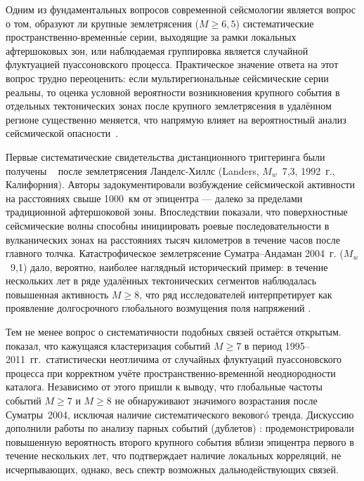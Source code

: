 \documentclass[12pt,a4paper]{article}
\begin{document}
Одним из фундаментальных вопросов современной сейсмологии является вопрос
о том, образуют ли крупные землетрясения ($M\geq6{,}5$) систематические
пространственно-временн\'{ы}е серии, выходящие за рамки локальных афтершоковых
зон, или наблюдаемая группировка является случайной флуктуацией пуассоновского
процесса. Практическое значение ответа на этот вопрос трудно переоценить:
если мультирегиональные сейсмические серии реальны, то оценка условной вероятности
возникновения крупного события в отдельных тектонических зонах после крупного
землетрясения в удалённом регионе существенно меняется, что напрямую влияет
на вероятностный анализ сейсмической опасности~\cite{Cornell1968}.

Первые систематические свидетельства дистанционного триггеринга были получены
\citeauthor{Hill1993}~\cite{Hill1993} после землетрясения Ланделс-Хиллс
(Landers, $M_w$~7,3, 1992~г., Калифорния). Авторы задокументировали возбуждение
сейсмической активности на расстояниях свыше 1000~км от эпицентра --- далеко за
пределами традиционной афтершоковой зоны. Впоследствии \citeauthor{Brodsky2006}
\cite{Brodsky2006} показали, что поверхностные сейсмические волны способны
инициировать роевые последовательности в вулканических зонах на расстояниях
тысяч километров в течение часов после главного толчка. Катастрофическое
землетрясение Суматра--Андаман 2004~г. ($M_w$~9,1) дало, вероятно, наиболее
наглядный исторический пример: в течение нескольких лет в ряде удалённых тектонических
сегментов наблюдалась повышенная активность $M\geq8$, что ряд исследователей
интерпретирует как проявление долгосрочного глобального возмущения поля напряжений
\cite{Freed2001,Pollitz1998}.

Тем не менее вопрос о систематичности подобных связей остаётся открытым.
\citeauthor{Michael2011}~\cite{Michael2011} показал, что кажущаяся кластеризация
событий $M\geq7$ в период 1995--2011~гг.\ статистически неотличима от случайных
флуктуаций пуассоновского процесса при корректном учёте пространственно-временн\'{о}й
неоднородности каталога. Независимо от этого \citeauthor{ShearerStark2012}
\cite{ShearerStark2012} пришли к выводу, что глобальные частоты событий $M\geq7$
и $M\geq8$ не обнаруживают значимого возрастания после Суматры~2004, исключая
наличие систематического вековогó тренда. Дискуссию дополнили работы по анализу
парных событий (дублетов) \cite{KaganJackson1999}: \citeauthor{KaganJackson1999}
продемонстрировали повышенную вероятность второго крупного события вблизи
эпицентра первого в течение нескольких лет, что подтверждает наличие локальных
корреляций, не исчерпывающих, однако, весь спектр возможных дальнодействующих связей.
\end{document}
